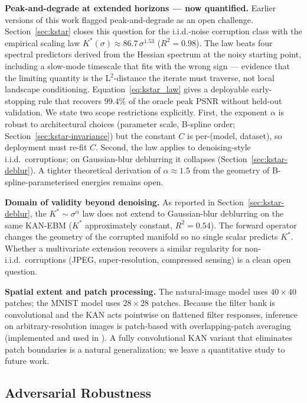 \documentclass{article}
\begin{document}
\textbf{Peak-and-degrade at extended horizons --- now quantified.} Earlier
versions of this work flagged peak-and-degrade as an open challenge.
Section~\ref{sec:kstar} closes this question for the i.i.d.-noise corruption
class with the empirical scaling law $K^{*}(\sigma)\approx 86.7\,\sigma^{1.53}$
($R^{2}{=}0.98$). The law beats four spectral predictors derived from the
Hessian spectrum at the noisy starting point, including a slow-mode timescale
that fits with the wrong sign --- evidence that the limiting quantity is the
L$^{2}$-distance the iterate must traverse, not local landscape conditioning.
Equation~\ref{eq:kstar_law} gives a deployable early-stopping rule that
recovers $99.4\%$ of the oracle peak PSNR without held-out validation. We
state two scope restrictions explicitly. First, the exponent $\alpha$ is
robust to architectural choices (parameter scale, B-spline order;
Section~\ref{sec:kstar-invariance}) but the constant $C$ is per-(model,
dataset), so deployment must re-fit $C$. Second, the law applies to
denoising-style i.i.d.\ corruptions; on Gaussian-blur deblurring it
collapses (Section~\ref{sec:kstar-deblur}). A tighter theoretical derivation
of $\alpha\approx 1.5$ from the geometry of B-spline-parameterised energies
remains open.

\textbf{Domain of validity beyond denoising.} As reported in
Section~\ref{sec:kstar-deblur}, the $K^{*}{\sim}\sigma^{\alpha}$ law does not
extend to Gaussian-blur deblurring on the same KAN-EBM ($K^{*}$ approximately
constant, $R^{2}{=}0.54$). The forward operator changes the geometry of the
corrupted manifold so no single scalar predicts $K^{*}$. Whether a multivariate
extension recovers a similar regularity for non-i.i.d.\ corruptions (JPEG,
super-resolution, compressed sensing) is a clean open question.

\textbf{Spatial extent and patch processing.} The natural-image model uses
$40{\times}40$ patches; the MNIST model uses $28{\times}28$ patches. Because
the filter bank is convolutional and the KAN acts pointwise on flattened filter
responses, inference on arbitrary-resolution images is patch-based with
overlapping-patch averaging (implemented and used in ). A
fully convolutional KAN variant that eliminates patch boundaries is a natural
generalization; we leave a quantitative study to future work.

\subsection{Adversarial Robustness}
\label{sec:robustness}
\end{document}
